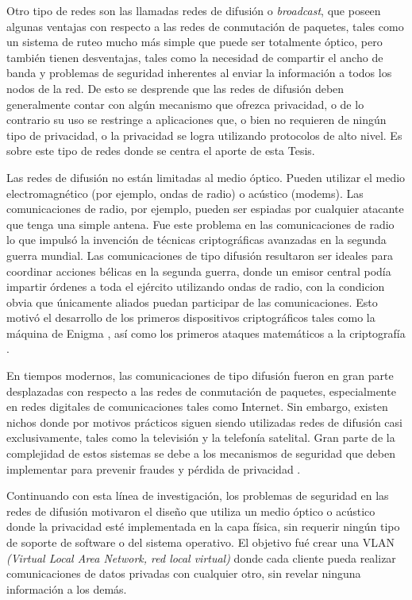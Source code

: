 Otro tipo de redes son las llamadas redes de difusión o \textit{broadcast}, que poseen algunas ventajas con respecto a las redes de conmutación de paquetes, tales como un sistema de ruteo mucho más simple que puede ser totalmente óptico, pero también tienen desventajas, tales como la necesidad de compartir el ancho de banda y problemas de seguridad inherentes al enviar la información a todos los nodos de la red. De esto se desprende que las redes de difusión deben generalmente contar con algún mecanismo que ofrezca privacidad, o de lo contrario su uso se restringe a aplicaciones que, o bien no requieren de ningún tipo de privacidad, o la privacidad se logra utilizando protocolos de alto nivel. Es sobre este tipo de redes donde se centra el aporte de esta Tesis.

Las redes de difusión no están limitadas al medio óptico. Pueden utilizar el medio electromagnético (por ejemplo, ondas de radio) o acústico (modems). Las comunicaciones de radio, por ejemplo, pueden ser espiadas por cualquier atacante que tenga una simple antena. Fue este problema en las comunicaciones de radio lo que impulsó la invención de técnicas criptográficas avanzadas en la segunda guerra mundial. Las comunicaciones de tipo difusión resultaron ser ideales para coordinar acciones bélicas en la segunda guerra, donde un emisor central podía impartir órdenes a toda el ejército utilizando ondas de radio, con la condicion obvia que únicamente aliados puedan participar de las comunicaciones. Esto motivó el desarrollo de los primeros dispositivos criptográficos tales como la máquina de Enigma \cite{kozaczuk1984enigma}, así como los primeros ataques matemáticos a la criptografía \cite{welchman1982hut}.

En tiempos modernos, las comunicaciones de tipo difusión fueron en gran parte desplazadas con respecto a las redes de conmutación de paquetes, especialmente en redes digitales de comunicaciones tales como Internet. Sin embargo, existen nichos donde por motivos prácticos siguen siendo utilizadas redes de difusión casi exclusivamente, tales como la televisión y la telefonía satelital. Gran parte de la complejidad de estos sistemas se debe a los mecanismos de seguridad que deben implementar para prevenir fraudes y pérdida de privacidad \cite{hanas1981addressable}.

Continuando con esta línea de investigación, los problemas de seguridad en las redes de difusión motivaron el diseño que utiliza un medio óptico o acústico donde la privacidad esté implementada en la capa física, sin requerir ningún tipo de soporte de software o del sistema operativo. El objetivo fué crear una VLAN \textit{(Virtual Local Area Network, red local virtual)} donde cada cliente pueda realizar comunicaciones de datos privadas con cualquier otro, sin revelar ninguna información a los demás.


